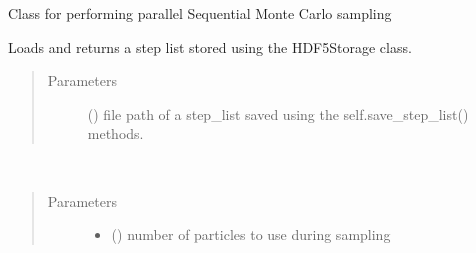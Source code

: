 \documentclass[letterpaper,10pt,english]{sphinxmanual}
\begin{document}
\begin{fulllineitems}
\label{\detokenize{source_code:smcpy.smc.smc_sampler.SMCSampler}}
Class for performing parallel Sequential Monte Carlo sampling

\begin{fulllineitems}
\label{\detokenize{source_code:smcpy.smc.smc_sampler.SMCSampler.load_step_list}}
Loads and returns a step list stored using the HDF5Storage
class.
\begin{quote}\begin{description}
\item[{Parameters}] \leavevmode
{} () \textendash{} file path of a step\_list saved using the
self.save\_step\_list() methods.

\end{description}\end{quote}

\end{fulllineitems}


\begin{fulllineitems}
\label{\detokenize{source_code:smcpy.smc.smc_sampler.SMCSampler.sample}}~\begin{quote}\begin{description}
\item[{Parameters}] \leavevmode\begin{itemize}
\item {} 
 () \textendash{} number of particles to use during sampling


\end{itemize}
\end{description}
\end{quote}
\end{fulllineitems}
\end{fulllineitems}
\end{document}
